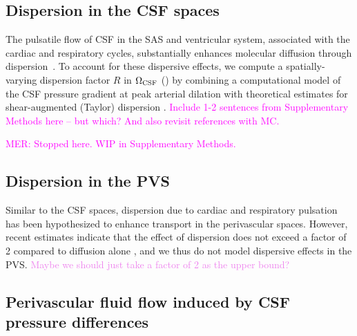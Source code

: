 \documentclass[fleqn,10pt]{wlscirep}
\newcommand{\mer}[1]{\textcolor{magenta}{#1}}
\newcommand{\mar}[1]{\textcolor{violet}{#1}}
\begin{document}
\subsection*{Dispersion in the CSF spaces}

The pulsatile flow of CSF in the SAS and ventricular system,
associated with the cardiac and respiratory cycles, substantially
enhances molecular diffusion through
dispersion~\cite{taylor1953dispersion, watson1983diffusion,
  asgari2016glymphatic, keith2019dispersion, ray2021quantitative,
  troyetsky2021dispersion}. To account for these dispersive effects,
we compute a spatially-varying dispersion factor $R$ in $\Omega_{\rm
  CSF}$ () by combining a computational model of
the CSF pressure gradient at peak arterial dilation with theoretical
estimates for shear-augmented (Taylor) dispersion
\cite{taylor1953dispersion, watson1983diffusion, keith2019dispersion}. \mer{Include 1-2 sentences from Supplementary Methods here -- but which? And also revisit references with MC.}

\mer{MER: Stopped here. WIP in Supplementary Methods.}

\subsection*{Dispersion in the PVS}

Similar to the CSF spaces, dispersion due to cardiac and respiratory pulsation has been hypothesized to enhance transport in the perivascular spaces. However, recent estimates indicate that the effect of dispersion does not exceed a factor of 2 compared to diffusion alone \cite{asgari2016glymphatic,keith2019dispersion,bojarskaite2023sleep,asgari2016glymphatic,troyetsky2021dispersion}, and we thus do not model dispersive effects in the PVS. 
\mar{Maybe we should just take a factor of 2 as the upper bound?}



\subsection*{Perivascular fluid flow induced by CSF pressure differences}
\end{document}
